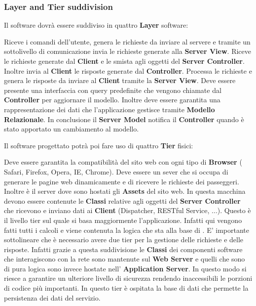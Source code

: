 \subsubsection{Layer and Tier suddivision}
Il software dovrà essere suddiviso in quattro \textbf{Layer} software: 
\begin{itemize}
	 Riceve i comandi dell'utente, genera le richieste da inviare al servere e tramite un sottolivello di comunicazione invia le richieste generate alla \textbf{Server View}.
	 Riceve le richieste generate dal \textbf{Client} e le smista agli oggetti del \textbf{Server Controller}. Inoltre invia al \textbf{Client} le risposte generate dal \textbf{Controller}.
	 Processa le richieste e genera le risposte da inviare al \textbf{Client} tramite la \textbf{Server View}.
	 Deve essere presente una interfaccia con query predefinite che vengono chiamate dal \textbf{Controller} per aggiornare il modello. Inoltre deve essere garantita una rappresentazione dei dati che l'applicazione gestisce tramite \textbf{Modello Relazionale}. In conclusione il \textbf{Server Model} notifica il \textbf{Controller} quando è stato apportato un cambiamento al modello.
\end{itemize}
Il software progettato potrà poi fare uso di quattro \textbf{Tier} fisici:
\begin{itemize}
	 Deve essere garantita la compatibilità del sito web con ogni tipo di \textbf{Browser} ( Safari, Firefox, Opera, IE, Chrome).
	 Deve essere un sever che si occupa di generare le pagine web dinamicamente e di ricevere le richieste dei passeggeri. Inoltre è il server dove sono hostati gli \textbf{Assets} del sito web. In questa macchina devono essere contenute le \textbf{Classi} relative agli oggetti del \textbf{Server Controller} che ricevono e inviano dati ai \textbf{Client} (Dispatcher, RESTful Service, ...).
	 Questo è il livello tier sul quale si basa maggiormente l'applicazione. 
	Infatti qui vengono fatti tutti i calcoli e viene contenuta la logica che sta alla base di \myTaxiService{}. 
	E' importante sottolineare che è necessario avere due tier per la gestione delle richieste e delle risposte. Infatti grazie a questa suddivisione le \textbf{Classi} dei componenti software che interagiscono con la rete sono mantenute sul \textbf{Web Server} e quelli che sono di pura logica sono invece hostate nell' \textbf{Application Server}.
	 In questo modo si riesce a garantire un ulteriore livello di sicurezza rendendo inaccessibili le porzioni di codice più importanti.
	  In questo tier è ospitata la base di dati che permette la persistenza dei dati del servizio.
\end{itemize}
